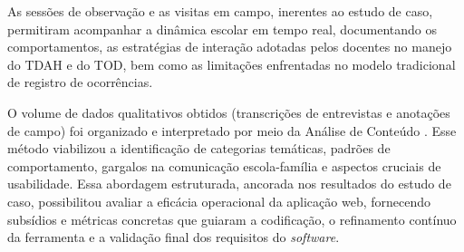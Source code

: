 As sessões de observação e as visitas em campo, inerentes ao estudo de caso, permitiram acompanhar a dinâmica escolar em tempo real, documentando os comportamentos, as estratégias de interação adotadas pelos docentes no manejo do TDAH e do TOD, bem como as limitações enfrentadas no modelo tradicional de registro de ocorrências.

O volume de dados qualitativos obtidos (transcrições de entrevistas e anotações de campo) foi organizado e interpretado por meio da Análise de Conteúdo . Esse método viabilizou a identificação de categorias temáticas, padrões de comportamento, gargalos na comunicação escola-família e aspectos cruciais de usabilidade. Essa abordagem estruturada, ancorada nos resultados do estudo de caso, possibilitou avaliar a eficácia operacional da aplicação web, fornecendo subsídios e métricas concretas que guiaram a codificação, o refinamento contínuo da ferramenta e a validação final dos requisitos do \textit{software}.